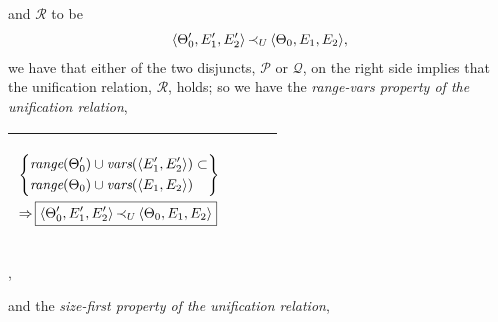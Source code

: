 \documentclass[runningheads]{llncs}
\DeclareMathOperator{\uimplies}{\Rightarrow}
\begin{document}
and  $\mathcal{R}$ to be
\[\begin{aligned}
 &\langle \Theta_{0}', E_{1}', E_{2}' \rangle 
 \, {\prec}_{U} \,
 \langle \Theta_{0}, E_{1}, E_{2} \rangle \\
 \end{aligned},\]
we have that either of the two disjuncts, $\mathcal{P}$ or $\mathcal{Q}$, on the right side implies that the unification relation, $\mathcal{R}$,  holds;  so we have the \emph{range-vars property of the unification relation},
  \begin{center}
  \begin{tabular}{|m{}|m{}||m{}|}
\hline
 \begin{center}
    $
  \begin{aligned}
   &\left\{\begin{aligned}
&\range(\Thet{0}')\cup\vars(\langle  \E{1}', \E{2}' \rangle) \subset \\
  &\range(\Thet{0})\cup\vars(\langle \E{1}, \E{2} \rangle) 
  \end{aligned}\right\}     
    & \begin{aligned}
 &\\
 \end{aligned}\, \\
&\uimplies  \boxed{\langle \Thet{0}', \E{1}', \E{2}' \rangle 
\,  \expsub{\prec}{\var{U}} \,
 \langle \Thet{0}, \E{1}, \E{2} \rangle}                     
  \end{aligned} 
    $
 \end{center}
  & &  \\  \hline
\end{tabular},
\end{center}
and the \emph{size-first property of the unification relation}, 
 
\end{document}
